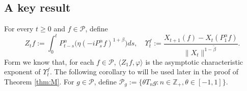\documentclass[12pt,a4paper]{amsart}
\theoremstyle{plain}
\newtheorem{lem}[thm]{Lemma}
\theoremstyle{definition}
\numberwithin{equation}{section}
\begin{document}
\subsection{A key result}
\begin{comment}
\begin{lem}\label{ineq: analysis}
There exists a constant $C>0$, such that for any $x,y \in \mathbb R$,
\[
    |(x+y)^{1+\beta}-x^{1+\beta}-y^{1+\beta}|\leq C(|x||y|^{\beta}+|x|^{\beta}|y|).
\]
\end{lem}
\begin{proof}
   Note that
\[
  \lim_{|y|\rightarrow \infty}\frac{(y+1)^{1+\beta}-y^{1+\beta}-1}{y^{\beta}}=\lim_{|y|\rightarrow \infty}\frac{(y+1)^{1+\beta}-y^{1+\beta}}{y^{\beta}}=\lim_{|y|\rightarrow \infty}\big((1+\frac{1}{y})^{1+\beta}-1\big)y = 1+\beta.
\]
Using this and continuity, we get that there exists {\color{blue}$C_1>0$} such that for all $|y|\geq 1$,
\[
  |(1+y)^{1+\beta}-y^{1+\beta}-1|\leq C_1 |y|^{\beta}.
\]
 Note that if $x = 0$ or $y= 0$, then the desired result is trivial.
So we only need to consider
 the case that $x \neq 0$ and $y \neq 0$.
 In this case, if $|x|\geq |y|$, we have
\[
|(x+y)^{1+\beta}-x^{1+\beta}-y^{1+\beta}|\leq |y|^{1+\beta}\bigg(\Big|\Big(1+\frac{x}{y}\Big)^{1+\beta}-\Big(\frac{x}{y}\Big)^{1+\beta}-1\Big|\bigg)\leq C_1|y||x|^{\beta};
\]
and  if $|x|\leq |y|$, we have
\[
	|(x+y)^{1+\beta}-x^{1+\beta}-y^{1+\beta}|
	\leq |x|^{1+\beta}\bigg( \Big| \Big(1+\frac{y}{x}\Big)^{1+\beta}-\Big(\frac{y}{x}\Big)^{1+\beta}-1\Big|\bigg)\leq C_1|x||y|^{\beta}.
\]
Combining the above, we immediately get the desired result.
\end{proof}
\end{comment}

For every $t\geq 0$ and $f\in \mathcal P$, define
\[
  	Z_t f
  	:= \int_0^t P^\alpha_{t-s}\big( \eta (-i P^\alpha_sf)^{1+\beta}\big)ds,\quad
  	\Upsilon^f_t
   := \frac{X_{t+1} (f) - X_t(P_1^\alpha f)}{\| X_t\|^{1-\tilde \beta}}.
\]
Form \cite[Theorem 3.4]{RenSongSunZhao2019Stable} we know that, for each $f\in \mathcal P$, $\langle Z_1f,\varphi\rangle$ is 
 the asymptotic characteristic exponent of $\Upsilon^f_t$.
The following corollary to  \cite[Proposition 3.5]{RenSongSunZhao2019Stable} will be used later in the proof of Theorem \ref{thm:M}.
%
For $g\in \mathcal P$, define $\mathcal P_g:= \{\theta T_ng:n \in \mathbb Z_+, \theta \in [-1,1]\}$.
\end{document}

